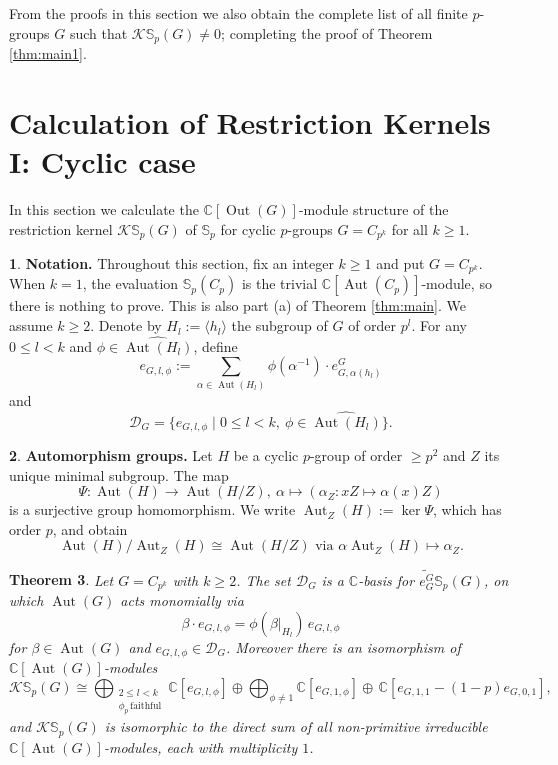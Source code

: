 \documentclass[12pt]{article}
\theoremstyle{plain}
\newtheorem{theorem}{Theorem}[section]
\theoremstyle{definition}
\newtheorem{nothing}[theorem]{}
\newcommand{\kerlin}{\mathbb S_p}
\newcommand{\out}{\operatorname{Out}}
\newcommand{\Aut}{\operatorname{Aut}}
\begin{document}
From the proofs in this section we also obtain the complete list of all finite $p$-groups $G$ such that $\mathcal K\kerlin(G)\not =0$; completing the proof of Theorem \ref{thm:main1}.

\section{Calculation of Restriction Kernels I: Cyclic case}\label{sec:restker}

In this section we calculate the $\mathbb C[\out(G)]$-module structure of the restriction kernel $\mathcal K\kerlin(G)$ of $\kerlin$ for cyclic \( p \)-groups $G = C_{p^k}$ for all $k\ge 1$.

\begin{nothing} {\textbf{Notation.}}
Throughout this section, fix an integer $k\ge 1$ and put $G = C_{p^k}$.
When $k=1$, the evaluation $\kerlin(C_p)$ is the trivial $\mathbb C[\Aut(C_p)]$-module, so there is nothing to prove. This is also part (a) of Theorem \ref{thm:main}. We assume $k\ge 2$.
Denote by $H_l:=\langle h_l\rangle$ the subgroup of $G$ of order $p^l$. For any $0\le l<k$ and $\phi\in \widehat{\Aut(H_l)}$, define
\[
e_{G, l, \phi} := \sum_{\alpha\in\Aut(H_l)}\phi(\alpha^{-1})\cdot e_{G, \alpha(h_l)}^G
\]
and
\[
\mathcal D_G=\{ e_{G, l, \phi} \mid 0\le l < k,\ \phi\in\widehat{\Aut(H_l)}\}.
\]
\end{nothing}

\begin{nothing} {\textbf{Automorphism groups.}}
Let $H$ be a cyclic $p$-group of order $\ge p^2$ and $Z$ its unique minimal subgroup. The map
\[
\Psi: \Aut(H)\to \Aut(H/Z),\ \alpha\mapsto (\alpha_Z: xZ\mapsto \alpha(x)Z)
\]
is a surjective group homomorphism. We write $\Aut_Z(H):= \ker\Psi$, which has order $p$, and obtain
\[
\Aut(H)/\Aut_Z(H) \cong \Aut(H/Z) \text{ via } \alpha\Aut_Z(H)\mapsto \alpha_Z.
\]
\end{nothing}

\begin{theorem}\label{thm:cyclic}
Let $G = C_{p^k}$ with $k\ge 2$. The set $\mathcal{D}_G$ is a $\mathbb C$-basis for 
$\widetilde{e_G^G}\kerlin(G)$, on which $\Aut(G)$ acts monomially via
\begin{equation}\label{eqn:phistar}
\beta\cdot e_{G, l, \phi} = \phi(\beta|_{H_l})\, e_{G, l, \phi}
\end{equation}
for $\beta\in\Aut(G)$ and $e_{G,l,\phi}\in\mathcal{D}_G$. Moreover there is an isomorphism 
of $\mathbb C[\Aut(G)]$-modules
\begin{equation}\label{eqn:cyclicfinal}
\mathcal K\kerlin(G) \cong \bigoplus_{\substack{2\le l< k\\ \phi_p\,\mathrm{faithful}}}
\mathbb C[e_{G, l, \phi}]
\oplus \bigoplus_{\phi\not = 1}\mathbb C[e_{G, 1, \phi}]
\oplus\, \mathbb C[e_{G, 1, 1} - (1-p)e_{G, 0, 1}],
\end{equation}
and $\mathcal{K}\kerlin(G)$ is isomorphic to the direct sum of all non-primitive irreducible
$\mathbb C[\Aut(G)]$-modules, each with multiplicity $1$.
\end{theorem}
\end{document}
